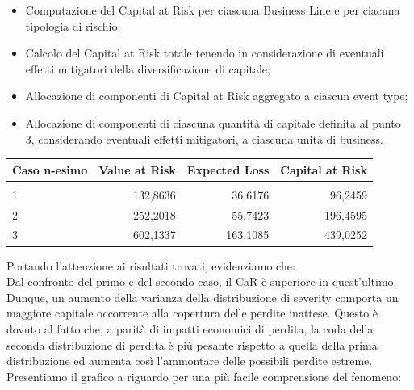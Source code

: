 \documentclass[titlepage]{article}
\begin{document}
\begin{itemize}
{\begin{itemize}
	\item 	Computazione del Capital at Risk per ciascuna Business Line e per ciacuna tipologia di rischio;
	\item Calcolo del Capital at Risk totale tenendo in considerazione di eventuali effetti mitigatori della diversificazione di capitale;
	\item 	Allocazione di componenti di Capital at Risk aggregato a ciascun event type;
	\item 	Allocazione di componenti di ciascuna quantità di capitale definita al punto 3, considerando eventuali effetti mitigatori, a ciascuna unità di business.
\end{itemize}
\begin{table}[htbp]
	\centering
	\begin{tabular}{l|rrr}
		Caso n-esimo & Value at Risk & Expected Loss& Capital at Risk \\\hline
		\\
		1 & 132,8636&36,6176&96,2459 \\
		2 & 252,2018 &55,7423&196,4595\\
		3 & 602,1337 &163,1085&439,0252
	\end{tabular}
\end{table}
\newpage
Portando l’attenzione ai risultati trovati, evidenziamo che:
\\

		Dal confronto del primo e del secondo caso, il CaR è superiore in quest’ultimo. Dunque, un aumento della varianza della distribuzione di severity comporta un maggiore capitale occorrente alla copertura delle perdite inattese. Questo è dovuto al fatto che, a parità di impatti economici di perdita, la coda della seconda distribuzione di perdita è più pesante rispetto a quella della prima distribuzione ed aumenta così l’ammontare delle possibili perdite estreme. Presentiamo il grafico a riguardo per una più facile comprensione del fenomeno:



}
\end{itemize}
\end{document}
